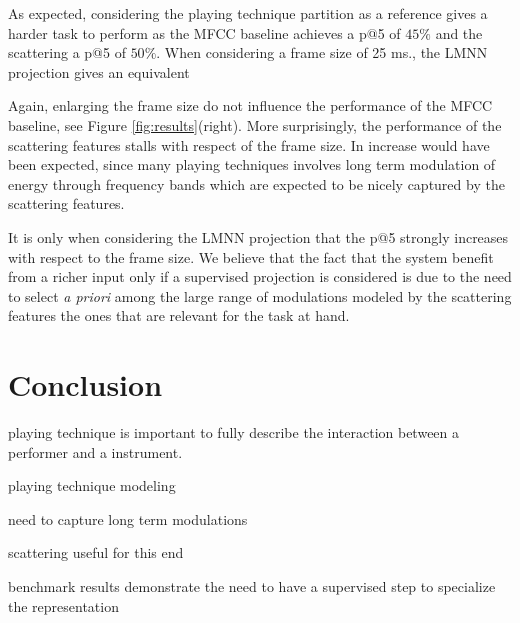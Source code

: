 \documentclass{article}
\makeatletter
\newcommand*{\ie}{i.e.\@\xspace}
\makeatother
\begin{document}
As expected, considering the playing technique partition as a reference gives a harder task to perform as the  MFCC baseline achieves a p@5 of $45\%$ and the scattering a p@5 of $50\%$.
When considering a frame size of 25 ms., the LMNN projection gives an equivalent


Again, enlarging the frame size do not influence the performance of the MFCC baseline, see Figure \ref{fig:results}(right). More surprisingly, the performance of the scattering features stalls with respect of the frame size. In increase would have been expected, since many playing techniques involves long term modulation of energy through frequency bands which are expected to be nicely captured by the scattering features.

It is only when considering the LMNN projection that the p@5 strongly increases with respect to the frame size. We believe that the fact that the system benefit from a richer input only if a supervised projection is considered is due to the need to select \textit{a priori} among the large range of modulations modeled by the scattering features the ones that are relevant for the task at hand.


\section{Conclusion}

playing technique is important to fully describe the interaction between a performer and a instrument.

playing technique modeling

need to capture long term modulations

scattering useful for this end

benchmark results demonstrate the need to have a supervised step to specialize the representation
\end{document}

